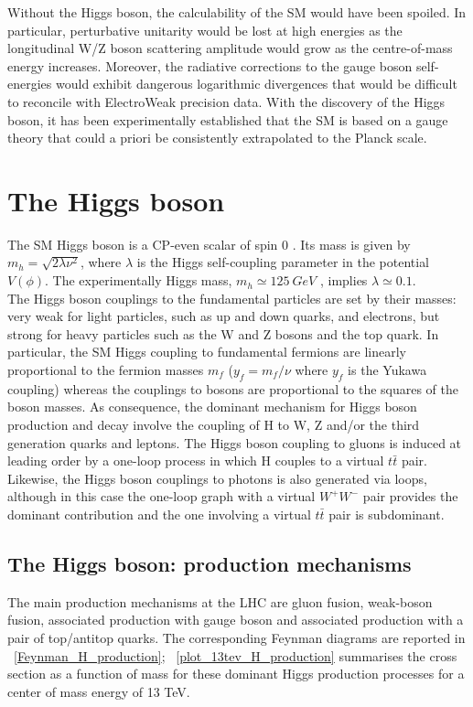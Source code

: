 Without the Higgs boson, the calculability of the SM would have been spoiled. In particular, perturbative unitarity \cite{PerturbativeHiggs_1, PerturbativeHiggs_2} would be lost at high energies as the longitudinal W/Z boson scattering amplitude would grow as the centre-of-mass energy increases. Moreover, the radiative corrections to the gauge boson self-energies would exhibit dangerous logarithmic divergences that would be difficult to reconcile with ElectroWeak precision data. With the discovery of the Higgs boson, it has been experimentally established that the SM is based on a gauge theory that could a priori be consistently extrapolated to the Planck scale.

\section{The Higgs boson}
The SM Higgs boson is a CP-even scalar of spin 0 \cite{PDG}. Its mass is given by $m_{h} = \sqrt{2\lambda\nu^{2}}$, where $\lambda$ is the Higgs self-coupling parameter in the potential $V(\phi)$. The experimentally Higgs mass, $m_{h} \simeq 125\ GeV$ \cite{ALTAS_H}\cite{CMS_H}, implies $\lambda \simeq 0.1$. \\
The Higgs boson couplings to the fundamental particles are set by their masses: very weak for light particles, such as up and down quarks, and electrons, but strong for heavy particles such as the W and Z bosons and the top quark. In particular, the SM Higgs coupling to fundamental fermions are linearly proportional to the fermion masses $m_{f}$ ($y_{f} = m_{f}/\nu$ where $y_{f}$ is the Yukawa coupling) whereas the couplings to bosons are proportional to the squares of the boson masses. As consequence, the dominant mechanism for Higgs boson production and decay involve the coupling of H to W, Z and/or the third generation quarks and leptons. The Higgs boson coupling to  gluons is induced at leading order by a one-loop process in which H couples to a virtual $t\bar{t}$ pair. Likewise, the Higgs boson couplings to photons is also generated via loops, although in this case the one-loop graph with a virtual $W^{+}W^{-}$ pair provides the dominant contribution and the one involving a virtual $t\bar{t}$ pair is subdominant. \\

\subsection{The Higgs boson: production mechanisms}
The main production mechanisms at the LHC are gluon fusion, weak-boson fusion, associated production with gauge boson and associated production with a pair of top/antitop quarks. 
The corresponding Feynman diagrams are reported in \figurename~\ref{Feynman_H_production}; \figurename~\ref{plot_13tev_H_production} summarises the cross section as a function of mass for these dominant Higgs production processes for a center of mass energy of 13 TeV. 

